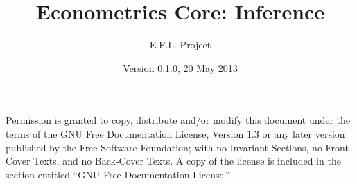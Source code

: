 \documentclass[nofonts]{tufte-latex/tufte-handout}
\title{Econometrics Core: Inference}
\author{E.F.L. Project}
\date{Version 0.1.0, 20 May 2013}
\begin{document}
\maketitle
\tableofcontents

  Permission is granted to
copy, distribute and/or modify this document under the terms of the
GNU Free Documentation License, Version 1.3 or any later version
published by the Free Software Foundation; with no Invariant Sections,
no Front-Cover Texts, and no Back-Cover Texts.  A copy of the license
is included in the section entitled ``GNU Free Documentation
License.''







\appendix

\end{document}
